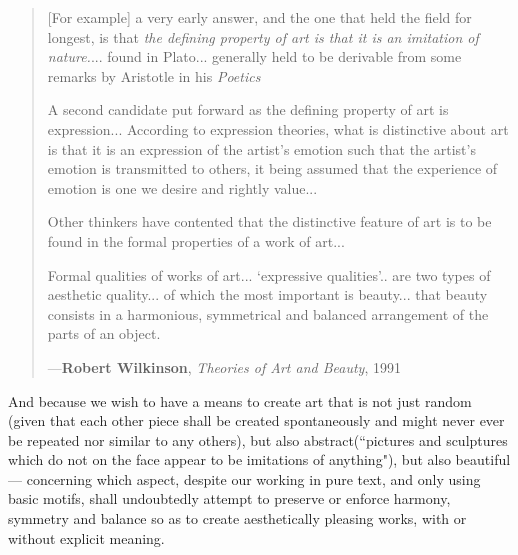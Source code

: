 \documentclass[a4paper, 18pt]{book} %
\begin{document}
{{{\begin{minipage}{1\textwidth}
\begin{quotation}
{\vspace{1em}

[For example] a very early answer, and the one that held the field for longest, is that \textit{the defining property of art is that it is an imitation of nature.}... found in Plato... generally held to be derivable from some remarks by Aristotle in his \textit{Poetics}

\vspace{1em}

A second candidate put forward as the defining property of art is expression... According to expression theories, what is distinctive about art is that it is an expression of the artist's emotion such that the artist's emotion is transmitted to others, it being assumed that the experience of emotion is one we desire and rightly value...

\vspace{1em}

Other thinkers have contented that the distinctive feature of art is to be found in the formal properties of a work of art...

\vspace{1em}

Formal qualities of works of art... `expressive qualities'.. are two types of aesthetic quality... of which the most important is beauty... that beauty consists in a harmonious, symmetrical and balanced arrangement of the parts of an object.

}
\hspace*{\fill} ---\textbf{Robert Wilkinson}, \textit{Theories of Art and Beauty}, 1991\cite{wilkinson1991theories}
\end{quotation}
\vspace{1em}
\end{minipage}



 \vspace{2em}
 
 And because we wish to have a means to create art that is not just random (given that each other piece shall be created spontaneously and might never ever be repeated nor similar to any others), but also abstract(``pictures and sculptures which do not on the face appear to be imitations of anything"\cite{wilkinson1991theories}), but also beautiful --- concerning which aspect, despite our working in pure text, and only using basic motifs, shall undoubtedly attempt to preserve or enforce harmony, symmetry and balance so as to create aesthetically pleasing works, with or without explicit meaning.


}}}
\end{document}
